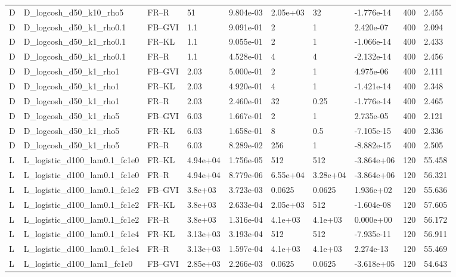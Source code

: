 \begin{tabular}{llllllllll}
D & D\_logcosh\_d50\_k10\_rho5 & FR--R & 51 & 9.804e-03 & 2.05e+03 & 32 & -1.776e-14 & 400 & 2.455 \\
D & D\_logcosh\_d50\_k1\_rho0.1 & FB--GVI & 1.1 & 9.091e-01 & 2 & 1 & 2.420e-07 & 400 & 2.094 \\
D & D\_logcosh\_d50\_k1\_rho0.1 & FR--KL & 1.1 & 9.055e-01 & 2 & 1 & -1.066e-14 & 400 & 2.433 \\
D & D\_logcosh\_d50\_k1\_rho0.1 & FR--R & 1.1 & 4.528e-01 & 4 & 4 & -2.132e-14 & 400 & 2.456 \\
D & D\_logcosh\_d50\_k1\_rho1 & FB--GVI & 2.03 & 5.000e-01 & 2 & 1 & 4.975e-06 & 400 & 2.111 \\
D & D\_logcosh\_d50\_k1\_rho1 & FR--KL & 2.03 & 4.920e-01 & 4 & 1 & -1.421e-14 & 400 & 2.348 \\
D & D\_logcosh\_d50\_k1\_rho1 & FR--R & 2.03 & 2.460e-01 & 32 & 0.25 & -1.776e-14 & 400 & 2.465 \\
D & D\_logcosh\_d50\_k1\_rho5 & FB--GVI & 6.03 & 1.667e-01 & 2 & 1 & 2.735e-05 & 400 & 2.121 \\
D & D\_logcosh\_d50\_k1\_rho5 & FR--KL & 6.03 & 1.658e-01 & 8 & 0.5 & -7.105e-15 & 400 & 2.336 \\
D & D\_logcosh\_d50\_k1\_rho5 & FR--R & 6.03 & 8.289e-02 & 256 & 1 & -8.882e-15 & 400 & 2.505 \\
L & L\_logistic\_d100\_lam0.1\_fc1e0 & FR--KL & 4.94e+04 & 1.756e-05 & 512 & 512 & -3.864e+06 & 120 & 55.458 \\
L & L\_logistic\_d100\_lam0.1\_fc1e0 & FR--R & 4.94e+04 & 8.779e-06 & 6.55e+04 & 3.28e+04 & -3.864e+06 & 120 & 56.321 \\
L & L\_logistic\_d100\_lam0.1\_fc1e2 & FB--GVI & 3.8e+03 & 3.723e-03 & 0.0625 & 0.0625 & 1.936e+02 & 120 & 55.636 \\
L & L\_logistic\_d100\_lam0.1\_fc1e2 & FR--KL & 3.8e+03 & 2.633e-04 & 2.05e+03 & 512 & -1.604e-08 & 120 & 57.605 \\
L & L\_logistic\_d100\_lam0.1\_fc1e2 & FR--R & 3.8e+03 & 1.316e-04 & 4.1e+03 & 4.1e+03 & 0.000e+00 & 120 & 56.172 \\
L & L\_logistic\_d100\_lam0.1\_fc1e4 & FR--KL & 3.13e+03 & 3.193e-04 & 512 & 512 & -7.935e-11 & 120 & 56.911 \\
L & L\_logistic\_d100\_lam0.1\_fc1e4 & FR--R & 3.13e+03 & 1.597e-04 & 4.1e+03 & 4.1e+03 & 2.274e-13 & 120 & 55.469 \\
L & L\_logistic\_d100\_lam1\_fc1e0 & FB--GVI & 2.85e+03 & 2.266e-03 & 0.0625 & 0.0625 & -3.618e+05 & 120 & 54.643 \\

\end{tabular}
